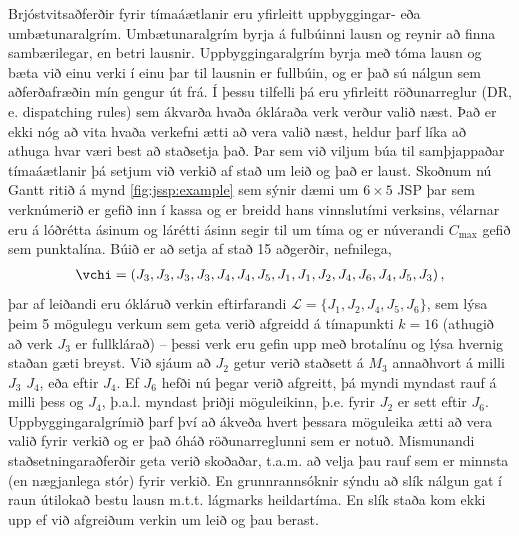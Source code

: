 \documentclass[]{article}
\begin{document}
Brjóstvitsaðferðir fyrir tímaáætlanir eru yfirleitt uppbyggingar- eða 
umbætunaralgrím.
Umbætunaralgrím byrja á fulbúinni lausn og reynir að finna sambærilegar, en 
betri lausnir. 
Uppbyggingaralgrím byrja með tóma lausn og bæta við einu verki í einu þar til 
lausnin er fullbúin, og er það sú nálgun sem aðferðafræðin mín gengur út frá. 
Í þessu tilfelli þá eru yfirleitt röðunarreglur (DR, e. dispatching 
rules) sem ákvarða hvaða ókláraða verk verður valið næst. Það er ekki nóg að 
vita hvaða verkefni ætti að vera valið næst, 
heldur þarf líka að athuga hvar væri best að staðsetja það. 
Þar sem við viljum búa til samþjappaðar tímaáætlanir  þá setjum við verkið af 
stað um leið og það er laust. 
Skoðnum nú Gantt ritið á mynd \ref{fig:jssp:example} sem sýnir dæmi um 
$6\times5$ JSP þar sem verknúmerið er gefið inn í kassa og er breidd hans 
vinnslutími verksins, 
vélarnar eru á lóðrétta ásinum og lárétti ásinn segir til um tíma 
og er núverandi $C_{\max}$ gefið sem punktalína. 
Búið er að setja af stað 15 aðgerðir, nefnilega, 
\begin{eqnarray}
\vchi=\left(J_3,J_3,J_3,J_3,J_4,J_4,J_5,J_1,J_1,J_2,J_4,J_6,J_4,J_5,J_3\right),
\end{eqnarray}
þar af leiðandi eru ókláruð verkin eftirfarandi 
$\mathcal{L}=\{J_1,J_2,J_4,J_5,J_6\}$, sem lýsa þeim 5 mögulegu verkum sem geta 
verið afgreidd á tímapunkti $k=16$ (athugið að verk $J_3$ er fullklárað) -- 
þessi verk eru gefin upp með brotalínu og lýsa hvernig staðan gæti breyst. 
Við sjáum að $J_2$ getur verið staðsett á $M_3$ annaðhvort á milli  $J_3$ 
$J_4$, eða eftir $J_4$.  Ef $J_6$ hefði nú þegar verið afgreitt, þá myndi 
myndast rauf á milli þess og $J_4$, þ.a.l. myndast þriðji möguleikinn, þ.e. 
fyrir $J_2$ er sett eftir $J_6$. 
Uppbyggingaralgrímið þarf því að ákveða hvert þessara möguleika ætti að vera 
valið fyrir verkið og er það óháð röðunarreglunni sem er notuð. 
Mismunandi staðsetningaraðferðir geta verið skoðaðar, t.a.m. að velja þau rauf 
sem er minnsta (en nægjanlega stór) fyrir verkið. En grunnrannsóknir sýndu að 
slík nálgun gat í raun útilokað bestu lausn m.t.t. lágmarks heildartíma. 
En slík staða kom ekki upp ef við afgreiðum verkin um leið og þau berast. 
\end{document}
